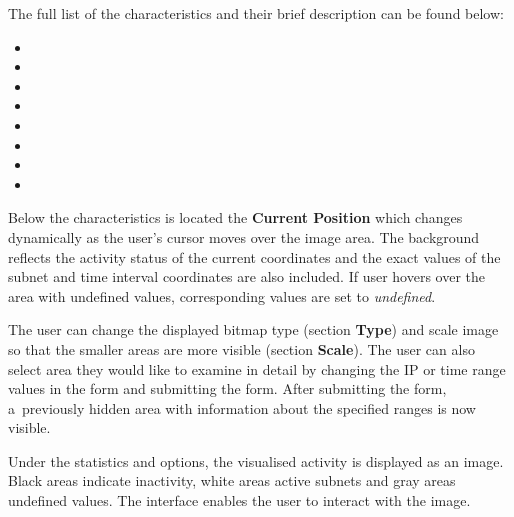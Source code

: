 The full list of the characteristics and their brief description can be found below:

\begin{itemize}
   \item {} 
   \item {} 
   \item {} 
   \item {} 
   \item {} 
   \item {} 
   \item {} 
   \item {} 
\end{itemize}

Below the characteristics is located the \textbf{Current Position} which
changes dynamically as the user's cursor moves over the image area. The
background reflects the activity status of the current coordinates and
the exact values of the subnet and time interval coordinates are also included.
If user hovers over the area with undefined values, corresponding values are set to
\textit{undefined}.

The user can change the displayed bitmap type (section \textbf{Type}) and
scale image so that the smaller areas are more visible (section \textbf{Scale}).
The user can also select area they would like to examine in detail by
changing the IP or time range values in the form and submitting the form.
After submitting the form, a~previously hidden area with information
about the specified ranges is now visible.

Under the statistics and options, the visualised activity is displayed as an image.
Black areas indicate inactivity, white areas active subnets and gray areas undefined
values. The interface enables the user to interact with the image.

